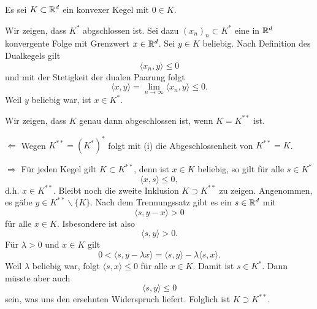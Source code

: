 
Es sei $K\subset \mathbb{R}^d$ ein konvexer Kegel mit $0\in K$.
\\
\begin{compactenum}[(i)]
 \item Wir zeigen, dass $K^*$ abgschlossen ist. Sei dazu $(x_n)_n\subset K^*$ eine in $\mathbb{R}^d$ konvergente
 Folge mit Grenzwert $x\in\mathbb{R}^d$. Sei $y\in K$ beliebig. Nach Definition des Dualkegels gilt 
 \begin{displaymath}
  \langle x_n,y\rangle\leq 0
 \end{displaymath}
 und mit der Stetigkeit der dualen Paarung folgt
 \begin{displaymath}
  \langle x, y\rangle =\lim_{n\to\infty}\langle x_n,y\rangle\leq 0.
 \end{displaymath} 
 Weil $y$ beliebig war, ist $x\in K^*$.
 \\
 \item Wir zeigen, dass $K$ genau dann abgeschlossen ist, wenn $K=K^{**}$ ist.
 \begin{compactenum}
 \item[$\Leftarrow$] Wegen $K^{**}=(K^*)^*$ folgt mit (i) die Abgeschlossenheit von $K^{**}=K$.
 \item[$\Rightarrow$] Für jeden Kegel gilt $K\subset K^{**}$, denn ist $x\in K$ beliebig,
 so gilt für alle $s\in K^*$
 \begin{displaymath}
    \langle x,s\rangle\leq 0,
 \end{displaymath}
 d.h. $x\in K^{**}$. Bleibt noch die zweite Inklusion $K\supset K^{**}$ zu zeigen. Angenommen, es gäbe
 $y\in K^{**}\backslash\{K\}$. Nach dem Trennungssatz gibt es ein $s\in \mathbb{R}^d$ mit 
 \begin{displaymath}
  \langle s, y-x\rangle > 0
 \end{displaymath}
 für alle $x\in K$. Isbesondere ist also
 \begin{displaymath}
  \langle s,y\rangle >0.
 \end{displaymath}
 Für $\lambda>0$ und $x\in K$ gilt 
 \begin{displaymath}
  0<\langle s, y-\lambda x\rangle=\langle s, y\rangle-\lambda\langle s, x\rangle.
 \end{displaymath}
 Weil $\lambda$ beliebig war, folgt $\langle s, x\rangle\leq 0$ für alle $x\in K$. 
 Damit ist $s\in K^*$. Dann müsste aber auch
 \begin{displaymath}
  \langle s,y\rangle \leq 0
 \end{displaymath}
 sein, was uns den ersehnten Widerspruch liefert. Folglich ist $K\supset K^{**}$.

\end{compactenum}
\end{compactenum}
